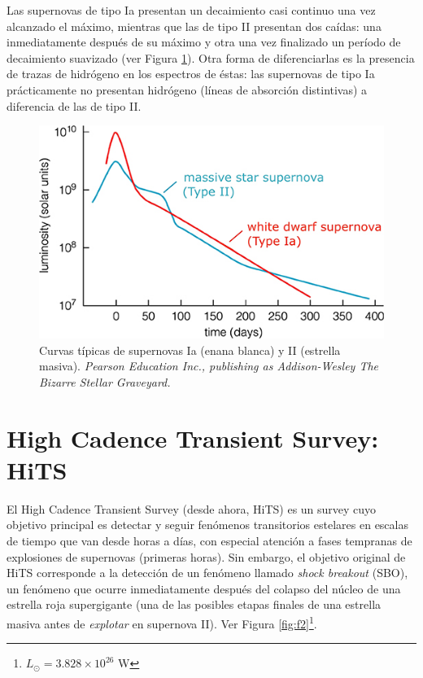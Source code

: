 Las supernovas de tipo Ia presentan un decaimiento casi continuo una vez alcanzado el m\'aximo, mientras que las de tipo II presentan dos ca\'idas: una inmediatamente despu\'es de su m\'aximo y otra una vez finalizado un per\'iodo de decaimiento suavizado (ver Figura \ref{fig:f1}). Otra forma de diferenciarlas es la presencia de trazas de hidr\'ogeno en los espectros de \'estas: las supernovas de tipo Ia pr\'acticamente no presentan hidr\'ogeno (l\'ineas de absorci\'on distintivas) a diferencia de las de tipo II.\bigskip

\begin{figure}[h!]
\centering
\includegraphics[scale=.8]{images/clear}
\caption{Curvas t\'ipicas de supernovas Ia (enana blanca) y II (estrella masiva). \textit{ Pearson Education Inc., publishing as Addison-Wesley The Bizarre Stellar Graveyard.}}
\label{fig:f1}
\end{figure}


\section{High Cadence Transient Survey: HiTS}

El High Cadence Transient Survey\cite{hits} (desde ahora, HiTS) es un survey cuyo objetivo principal es detectar y seguir fen\'omenos transitorios estelares en escalas de tiempo que van desde horas a d\'ias, con especial atenci\'on a fases tempranas de explosiones de supernovas (primeras horas). Sin embargo, el objetivo original de HiTS corresponde a la detecci\'on de un fen\'omeno llamado \textit{shock breakout} (SBO), un fen\'omeno que ocurre inmediatamente despu\'es del colapso del n\'ucleo de una estrella roja supergigante (una de las posibles etapas finales de una estrella masiva antes de \textit{explotar} en supernova II). Ver Figura \ref{fig:f2}\footnote{$L_{\odot}= 3.828 \times 10^{26}$ W}.


